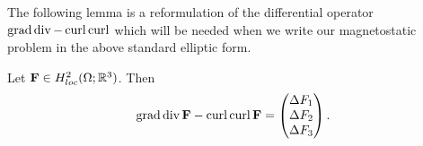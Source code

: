 \documentclass[../master_thesis.tex]{subfiles}
\begin{document}
The following lemma is a reformulation of the differential operator 
$\operatorname{grad} \operatorname{div} - \operatorname{curl} \operatorname{curl}$ which will be needed when we write our 
magnetostatic problem in the above standard elliptic form.

\begin{lemma}\label{lem:graddiv_curlcurl_equals_componentwise_laplacian}
    Let $\mathbf{F} \in H^2_{loc}(\Omega;\mathbb{R}^3)$. Then 
    \begin{align*}
        \operatorname{grad} \operatorname{div} \mathbf{F} - \operatorname{curl} \operatorname{curl} \mathbf{F} 
        = \begin{pmatrix} \Delta F_1 \\ \Delta F_2 
            \\ \Delta F_3  \end{pmatrix}.
    \end{align*}
\end{lemma}
\end{document}
